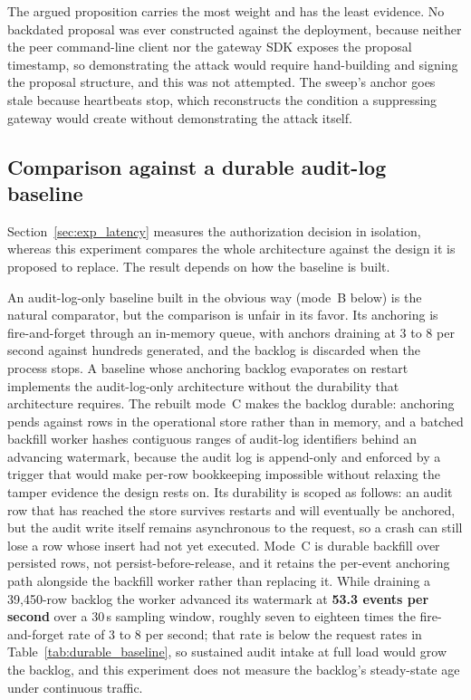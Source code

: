 \documentclass[preprint,12pt]{elsarticle}
\begin{document}
The argued proposition carries the most weight and has the least evidence. No
backdated proposal was ever constructed against the deployment, because
neither the peer command-line client nor the gateway SDK exposes the proposal
timestamp, so demonstrating the attack would require hand-building and signing
the proposal structure, and this was not attempted. The sweep's anchor goes
stale because heartbeats stop, which reconstructs the condition a suppressing
gateway would create without demonstrating the attack itself.



\subsection{Comparison against a durable audit-log baseline}
\label{sec:exp_durable_baseline}

Section~\ref{sec:exp_latency} measures the authorization decision in
isolation, whereas this experiment compares the whole architecture against the
design it is proposed to replace. The result depends on how the baseline is
built.

An audit-log-only baseline built in the obvious way (mode~B below) is the
natural comparator, but the comparison is unfair in its favor. Its anchoring
is fire-and-forget through an in-memory queue, with anchors draining at 3 to 8
per second against hundreds generated, and the backlog is discarded when the
process stops. A baseline whose anchoring backlog evaporates on restart
implements the audit-log-only architecture without the durability that
architecture requires. The rebuilt mode~C makes the backlog durable: anchoring pends against rows in the
operational store rather than in memory, and a batched backfill worker hashes
contiguous ranges of audit-log identifiers behind an advancing watermark,
because the audit log is append-only and enforced by a trigger that would make
per-row bookkeeping impossible without relaxing the tamper evidence the design
rests on. Its durability is scoped as follows: an audit row that has reached
the store survives restarts and will eventually be anchored, but the audit
write itself remains asynchronous to the request, so a crash can still lose a
row whose insert had not yet executed. Mode~C is durable backfill over
persisted rows, not persist-before-release, and it retains the per-event
anchoring path alongside the backfill worker rather than replacing it.
While draining a 39{,}450-row backlog the worker advanced its watermark at
\textbf{53.3 events per second} over a 30\,s sampling window, roughly seven
to eighteen times the fire-and-forget rate of 3 to 8 per second; that rate is
below the
request rates in Table~\ref{tab:durable_baseline}, so sustained audit intake
at full load would grow the backlog, and this experiment does not measure the
backlog's steady-state age under continuous traffic.
\end{document}
